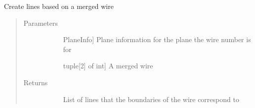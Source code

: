 \documentclass[letterpaper,10pt,english]{sphinxmanual}
\begin{document}
\begin{fulllineitems}
\label{\detokenize{geometryReco:geometryReco.makeLines}}
Create lines based on a merged wire
\begin{quote}\begin{description}
\item[{Parameters}] \leavevmode\begin{description}
\item[{}] \leavevmode{[}PlaneInfo{]}
Plane information for the plane the wire number is for

\item[{}] \leavevmode{[}tuple{[}2{]} of int{]}
A merged wire

\end{description}

\item[{Returns}] \leavevmode\begin{description}
\item[{}] \leavevmode
List of lines that the boundaries of the wire correspond to

\end{description}

\end{description}\end{quote}

\end{fulllineitems}

\end{document}
